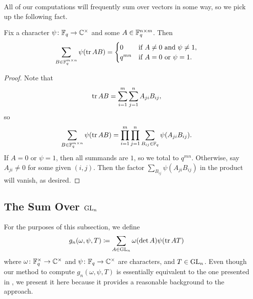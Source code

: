 All of our computations will frequently sum over vectors in some way, so we pick up the following fact.
\begin{lemma} \label{lem:matrix-char-sum}
    Fix a character $\psi\colon\mathbb F_q\to\mathbb C^\times$ and some $A\in\mathbb F_q^{n\times m}$. Then
    \[\sum_{B\in\mathbb F_q^{m\times n}}\psi(\operatorname{tr} AB)=\begin{cases}
        0 & \text{if }A\ne0\text{ and }\psi\ne1, \\
        q^{mn} & \text{if }A=0\text{ or }\psi=1.
    \end{cases}\]
\end{lemma}
\begin{proof}
    Note that
    \[\operatorname{tr} AB=\sum_{i=1}^m\sum_{j=1}^nA_{ji}B_{ij},\]
    so
    \[\sum_{B\in\mathbb F_q^{m\times n}}\psi(\operatorname{tr} AB)=\prod_{i=1}^m\prod_{j=1}^n\sum_{B_{ij} \in \mathbb F_q}\psi(A_{ji}B_{ij}).\]
    If $A=0$ or $\psi=1$, then all summands are $1$, so we total to $q^{mn}$. Otherwise, say $A_{ji}\ne0$ for some given $(i,j)$. Then the factor $\sum_{B_{ij}}\psi(A_{ji}B_{ij})$ in the product will vanish, as desired.
\end{proof}

\subsection{The Sum Over \texorpdfstring{$\mathrm{GL}_n$}{GL}}
For the purposes of this subsection, we define
\[g_n(\omega,\psi,T)\coloneqq\sum_{A\in\mathrm{GL}_n}\omega(\det A)\psi(\operatorname{tr} AT)\]
where $\omega\colon\mathbb F_q^\times\to\mathbb C^\times$ and $\psi\colon\mathbb F_q\to\mathbb C^\times$ are characters, and $T\in\mathrm{GL}_n$. Even though our method to compute $g_n(\omega,\psi,T)$ is essentially equivalent to the one presented in \cite{kim-gauss-sum}, we present it here because it provides a reasonable background to the approach.

